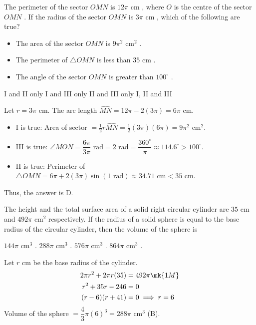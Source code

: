 
\question The perimeter of the sector $OMN$ is $12\pi\text{ cm}$ , where $O$ is the centre of the sector $OMN$ . If the radius of the sector $OMN$ is $3\pi\text{ cm}$ , which of the following are true?
\begin{itemize}
    \item[I.] The area of the sector $OMN$ is $9\pi^2\text{ cm}^2$ .
    \item[II.] The perimeter of $\triangle OMN$ is less than $35\text{ cm}$ .
    \item[III.] The angle of the sector $OMN$ is greater than $100^\circ$ .
\end{itemize}
\begin{choices}
    \choice I and II only
    \choice I and III only
    \choice II and III only
    \correctchoice I, II and III
\end{choices}
\begin{solution}
Let $r = 3\pi\text{ cm}$. The arc length $\widehat{MN} = 12\pi - 2(3\pi) = 6\pi\text{ cm}$. 
\begin{itemize}
    \item I is true: Area of sector $= \frac{1}{2}r\widehat{MN} = \frac{1}{2}(3\pi)(6\pi) = 9\pi^2\text{ cm}^2$.
    \item III is true: $\angle MON = \dfrac{6\pi}{3\pi}\text{ rad} = 2\text{ rad} = \dfrac{360^\circ}{\pi} \approx 114.6^\circ > 100^\circ$.
    \item II is true: Perimeter of $\triangle OMN = 6\pi + 2(3\pi)\sin(1\text{ rad}) \approx 34.71\text{ cm} < 35\text{ cm}$. 
\end{itemize}
Thus, the answer is D.
\end{solution}

\question The height and the total surface area of a solid right circular cylinder are $35\text{ cm}$ and $492\pi\text{ cm}^2$ respectively. If the radius of a solid sphere is equal to the base radius of the circular cylinder, then the volume of the sphere is
\begin{choices}
    \choice $144\pi\text{ cm}^3$ .
    \correctchoice $288\pi\text{ cm}^3$ .
    \choice $576\pi\text{ cm}^3$ .
    \choice $864\pi\text{ cm}^3$ .
\end{choices}
\begin{solution}
Let $r\text{ cm}$ be the base radius of the cylinder.
\begin{align*}
2\pi r^2 + 2\pi r(35) &= 492\pi \mk{1M} \\
r^2 + 35r - 246 &= 0 \\
(r - 6)(r + 41) &= 0 \implies r = 6
\end{align*}
Volume of the sphere $= \dfrac{4}{3}\pi(6)^3 = 288\pi\text{ cm}^3$ (B). 
\end{solution}

